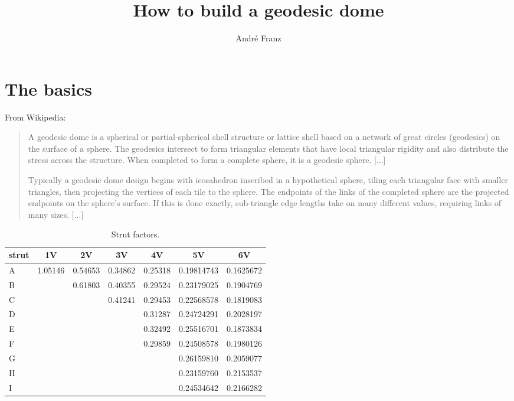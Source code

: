 \documentclass[a4paper,12pt,draft]{article}
\title{How to build a geodesic dome}
\author{Andr\'{e} Franz}
\date{}
\begin{document}
\maketitle

\section{The basics}
From Wikipedia:
\begin{quote}
A geodesic dome is a spherical or partial-spherical shell structure or lattice shell based on a network of great circles (geodesics) on the surface of a sphere. The geodesics intersect to form triangular elements that have local triangular rigidity and also distribute the stress across the structure. When completed to form a complete sphere, it is a geodesic sphere. [...]

Typically a geodesic dome design begins with icosahedron inscribed in a hypothetical sphere, tiling each triangular face with smaller triangles, then projecting the vertices of each tile to the sphere. The endpoints of the links of the completed sphere are the projected endpoints on the sphere's surface. If this is done exactly, sub-triangle edge lengths take on many different values, requiring links of many sizes. [...]
\end{quote}


\begin{table}[ht]
	\caption{Strut factors.}
	\begin{tabular}{l|cccccc}
strut	&	1V		& 2V		& 3V		& 4V		& 5V			& 6V		\\	\hline
	A	& 1.05146	& 0.54653	& 0.34862	& 0.25318	& 0.19814743	& 0.1625672	\\
	B	&			& 0.61803	& 0.40355	& 0.29524	& 0.23179025	& 0.1904769	\\
	C	&			&			& 0.41241	& 0.29453	& 0.22568578	& 0.1819083	\\
	D	&			&			&			& 0.31287	& 0.24724291	& 0.2028197	\\
	E	&			&			&			& 0.32492	& 0.25516701	& 0.1873834	\\
	F	&			&			&			& 0.29859	& 0.24508578	& 0.1980126	\\
	G	&			&			&			&			& 0.26159810	& 0.2059077	\\
	H	&			&			&			&			& 0.23159760	& 0.2153537	\\
	I	&			&			&			&			& 0.24534642	& 0.2166282
	\end{tabular}
	\label{tab:strut_factors}
\end{table}
\end{document}
